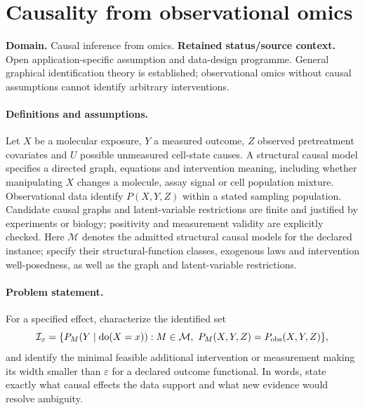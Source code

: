 \documentclass[11pt]{article}
\begin{document}
\section*{Causality from observational omics}
\label{prob:047}
\label{rank:60}
\par\smallskip

\noindent\textbf{Domain.} Causal inference from omics. \quad \textbf{Retained status/source context.} Open application-specific assumption and data-design programme. General graphical identification theory is established; observational omics without causal assumptions cannot identify arbitrary interventions.
\paragraph{Definitions and assumptions.} Let $X$ be a molecular exposure, $Y$ a measured outcome, $Z$ observed pretreatment covariates and $U$ possible unmeasured cell-state causes. A structural causal model specifies a directed graph, equations and intervention meaning, including whether manipulating $X$ changes a molecule, assay signal or cell population mixture. Observational data identify $P(X,Y,Z)$ within a stated sampling population. Candidate causal graphs and latent-variable restrictions are finite and justified by experiments or biology; positivity and measurement validity are explicitly checked. Here $\mathcal M$ denotes the admitted structural causal models for the declared instance; specify their structural-function classes, exogenous laws and intervention well-posedness, as well as the graph and latent-variable restrictions.
\paragraph{Problem statement.} For a specified effect, characterize the identified set
\[
\mathcal I_x=\{P_M(Y\mid\operatorname{do}(X=x)):M\in\mathcal M,
\ P_M(X,Y,Z)=P_{\rm obs}(X,Y,Z)\},
\]
and identify the minimal feasible additional intervention or measurement making its width smaller than $\varepsilon$ for a declared outcome functional. In words, state exactly what causal effects the data support and what new evidence would resolve ambiguity.
\end{document}
